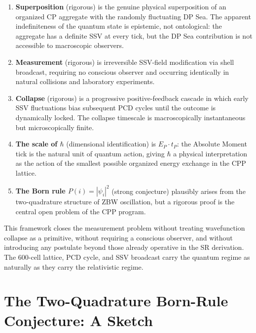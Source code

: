 \documentclass[12pt]{article}
\newcommand{\EP}{E_P}
\newcommand{\tP}{t_P}
\begin{document}
\begin{enumerate}
  \item \textbf{Superposition} (rigorous) is the genuine physical
    superposition of an organized CP aggregate with the randomly fluctuating
    DP Sea.  The apparent indefiniteness of the quantum state is epistemic,
    not ontological: the aggregate has a definite SSV at every tick, but the
    DP Sea contribution is not accessible to macroscopic observers.

  \item \textbf{Measurement} (rigorous) is irreversible SSV-field
    modification via shell broadcast, requiring no conscious observer and
    occurring identically in natural collisions and laboratory experiments.

  \item \textbf{Collapse} (rigorous) is a progressive positive-feedback
    cascade in which early SSV fluctuations bias subsequent PCD cycles until
    the outcome is dynamically locked.  The collapse timescale is
    macroscopically instantaneous but microscopically finite.

  \item \textbf{The scale of $\hbar$} (dimensional identification) is
    $\EP\cdot\tP$: the Absolute Moment tick is the natural unit of quantum
    action, giving $\hbar$ a physical interpretation as the action of the
    smallest possible organized energy exchange in the CPP lattice.

  \item \textbf{The Born rule $P(i) = |\psi_i|^2$} (strong conjecture)
    plausibly arises from the two-quadrature structure of ZBW oscillation,
    but a rigorous proof is the central open problem of the CPP program.
\end{enumerate}

This framework closes the measurement problem without treating wavefunction
collapse as a primitive, without requiring a conscious observer, and without
introducing any postulate beyond those already operative in the SR derivation.
The 600-cell lattice, PCD cycle, and SSV broadcast carry the quantum regime
as naturally as they carry the relativistic regime.

\appendix
\section{The Two-Quadrature Born-Rule Conjecture: A Sketch}
\label{app:born}
\end{document}
